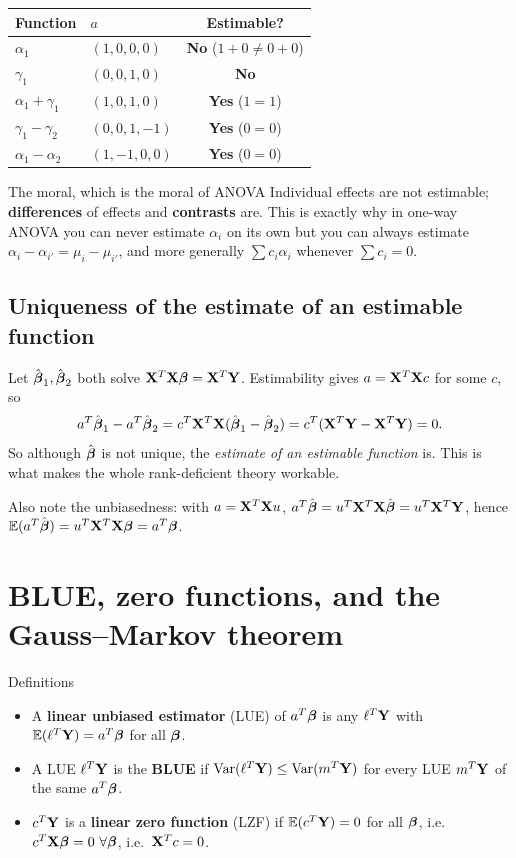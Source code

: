 \documentclass[11pt]{article}
\begin{document}
\begin{center}
\begin{tabular}{@{}llc@{}}
\toprule
Function & $a$ & Estimable? \\
\midrule
$\alpha_1$ & $(1,0,0,0)$ & \textbf{No} ($1+0\ne0+0$) \\
$\gamma_1$ & $(0,0,1,0)$ & \textbf{No} \\
$\alpha_1+\gamma_1$ & $(1,0,1,0)$ & \textbf{Yes} ($1=1$) \\
$\gamma_1-\gamma_2$ & $(0,0,1,-1)$ & \textbf{Yes} ($0=0$) \\
$\alpha_1-\alpha_2$ & $(1,-1,0,0)$ & \textbf{Yes} ($0=0$) \\
\bottomrule
\end{tabular}
\end{center}

\begin{idea}{The moral, which is the moral of ANOVA}
Individual effects are not estimable; \textbf{differences} of effects and \textbf{contrasts}
are. This is exactly why in one-way ANOVA you can never estimate $\alpha_i$ on its own but
you can always estimate $\alpha_i-\alpha_{i'}=\mu_i-\mu_{i'}$, and more generally
$\sum c_i\alpha_i$ whenever $\sum c_i=0$.
\end{idea}

\subsection{Uniqueness of the estimate of an estimable function}

Let $\hat{\boldsymbol{\beta}}_1,\hat{\boldsymbol{\beta}}_2$ both solve $\mathbf{X}^T\mathbf{X}\boldsymbol{\beta}=\mathbf{X}^T\mathbf{Y}$. Estimability gives $a=\mathbf{X}^T\mathbf{X} c$
for some $c$, so
\[
  a^T\hat{\boldsymbol{\beta}}_1-a^T\hat{\boldsymbol{\beta}}_2=c^T\mathbf{X}^T\mathbf{X}(\hat{\boldsymbol{\beta}}_1-\hat{\boldsymbol{\beta}}_2)=c^T(\mathbf{X}^T\mathbf{Y}-\mathbf{X}^T\mathbf{Y})=0 .
\]
So although $\hat{\boldsymbol{\beta}}$ is not unique, the \emph{estimate of an estimable function} is. This
is what makes the whole rank-deficient theory workable.

Also note the unbiasedness: with $a=\mathbf{X}^T\mathbf{X} u$,
$a^T\hat{\boldsymbol{\beta}}=u^T\mathbf{X}^T\mathbf{X}\hat{\boldsymbol{\beta}}=u^T\mathbf{X}^T\mathbf{Y}$, hence
$\mathbb{E}(a^T\hat{\boldsymbol{\beta}})=u^T\mathbf{X}^T\mathbf{X}\boldsymbol{\beta}=a^T\boldsymbol{\beta}$.

\section{BLUE, zero functions, and the Gauss--Markov theorem}

\begin{idea}{Definitions}
\begin{itemize}
  \item A \textbf{linear unbiased estimator} (LUE) of $a^T\boldsymbol{\beta}$ is any $\ell^T\mathbf{Y}$ with
        $\mathbb{E}(\ell^T\mathbf{Y})=a^T\boldsymbol{\beta}$ for all $\boldsymbol{\beta}$.
  \item A LUE $\ell^T\mathbf{Y}$ is the \textbf{BLUE} if $\operatorname{Var}(\ell^T\mathbf{Y})\le\operatorname{Var}(m^T\mathbf{Y})$ for every
        LUE $m^T\mathbf{Y}$ of the same $a^T\boldsymbol{\beta}$.
  \item $c^T\mathbf{Y}$ is a \textbf{linear zero function} (LZF) if $\mathbb{E}(c^T\mathbf{Y})=0$ for all $\boldsymbol{\beta}$,
        i.e.\ $c^T\mathbf{X}\boldsymbol{\beta}=0\ \forall\boldsymbol{\beta}$, i.e.\ $\mathbf{X}^Tc=0$.
\end{itemize}
\end{idea}
\end{document}
